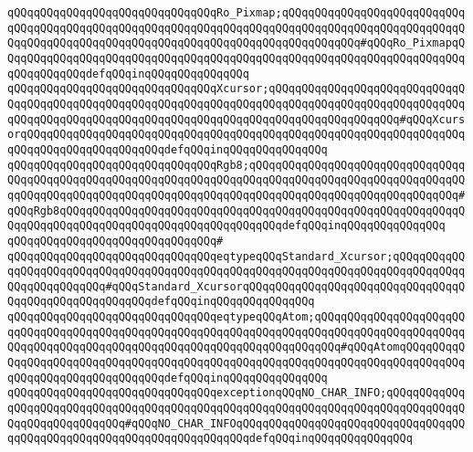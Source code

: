 \verb|qQQqqQQqqQQqqQQqqQQqqQQqqQQqqQQqRo_Pixmap;qQQqqQQqqQQqqQQqqQQqqQQqqQQqqQQqqQQqqQQqqQQqqQQqqQQqqQQqqQQqqQQqqQQqqQQqqQQqqQQqqQQqqQQqqQQqqQQqqQQqqQQqqQQqqQQqqQQqqQQqqQQqqQQqqQQqqQQqqQQqqQQqqQQqqQQq#qQQqRo_PixmapqQQqqQQqqQQqqQQqqQQqqQQqqQQqqQQqqQQqqQQqqQQqqQQqqQQqqQQqqQQqqQQqqQQqqQQqqQQqqQQqqQQqdefqQQqinqQQqqQQqqQQqqQQq|\newline
\verb|qQQqqQQqqQQqqQQqqQQqqQQqqQQqqQQqXcursor;qQQqqQQqqQQqqQQqqQQqqQQqqQQqqQQqqQQqqQQqqQQqqQQqqQQqqQQqqQQqqQQqqQQqqQQqqQQqqQQqqQQqqQQqqQQqqQQqqQQqqQQqqQQqqQQqqQQqqQQqqQQqqQQqqQQqqQQqqQQqqQQqqQQqqQQqqQQqqQQq#qQQqXcursorqQQqqQQqqQQqqQQqqQQqqQQqqQQqqQQqqQQqqQQqqQQqqQQqqQQqqQQqqQQqqQQqqQQqqQQqqQQqqQQqqQQqqQQqqQQqdefqQQqinqQQqqQQqqQQqqQQq|\newline
\verb|qQQqqQQqqQQqqQQqqQQqqQQqqQQqqQQqRgb8;qQQqqQQqqQQqqQQqqQQqqQQqqQQqqQQqqQQqqQQqqQQqqQQqqQQqqQQqqQQqqQQqqQQqqQQqqQQqqQQqqQQqqQQqqQQqqQQqqQQqqQQqqQQqqQQqqQQqqQQqqQQqqQQqqQQqqQQqqQQqqQQqqQQqqQQqqQQqqQQqqQQqqQQqqQQq#qQQqRgb8qQQqqQQqqQQqqQQqqQQqqQQqqQQqqQQqqQQqqQQqqQQqqQQqqQQqqQQqqQQqqQQqqQQqqQQqqQQqqQQqqQQqqQQqqQQqqQQqqQQqqQQqdefqQQqinqQQqqQQqqQQqqQQq|\newline
\verb|qQQqqQQqqQQqqQQqqQQqqQQqqQQqqQQq#|\newline
\verb|qQQqqQQqqQQqqQQqqQQqqQQqqQQqqQQqeqtypeqQQqStandard_Xcursor;qQQqqQQqqQQqqQQqqQQqqQQqqQQqqQQqqQQqqQQqqQQqqQQqqQQqqQQqqQQqqQQqqQQqqQQqqQQqqQQqqQQqqQQqqQQqqQQq#qQQqStandard_XcursorqQQqqQQqqQQqqQQqqQQqqQQqqQQqqQQqqQQqqQQqqQQqqQQqqQQqqQQqdefqQQqinqQQqqQQqqQQqqQQq|\newline
\verb|qQQqqQQqqQQqqQQqqQQqqQQqqQQqqQQqeqtypeqQQqAtom;qQQqqQQqqQQqqQQqqQQqqQQqqQQqqQQqqQQqqQQqqQQqqQQqqQQqqQQqqQQqqQQqqQQqqQQqqQQqqQQqqQQqqQQqqQQqqQQqqQQqqQQqqQQqqQQqqQQqqQQqqQQqqQQqqQQqqQQqqQQqqQQq#qQQqAtomqQQqqQQqqQQqqQQqqQQqqQQqqQQqqQQqqQQqqQQqqQQqqQQqqQQqqQQqqQQqqQQqqQQqqQQqqQQqqQQqqQQqqQQqqQQqqQQqqQQqqQQqdefqQQqinqQQqqQQqqQQqqQQq|\newline
\newline
\verb|qQQqqQQqqQQqqQQqqQQqqQQqqQQqqQQqexceptionqQQqNO_CHAR_INFO;qQQqqQQqqQQqqQQqqQQqqQQqqQQqqQQqqQQqqQQqqQQqqQQqqQQqqQQqqQQqqQQqqQQqqQQqqQQqqQQqqQQqqQQqqQQqqQQqqQQq#qQQqNO_CHAR_INFOqQQqqQQqqQQqqQQqqQQqqQQqqQQqqQQqqQQqqQQqqQQqqQQqqQQqqQQqqQQqqQQqqQQqqQQqdefqQQqinqQQqqQQqqQQqqQQq|\newline
